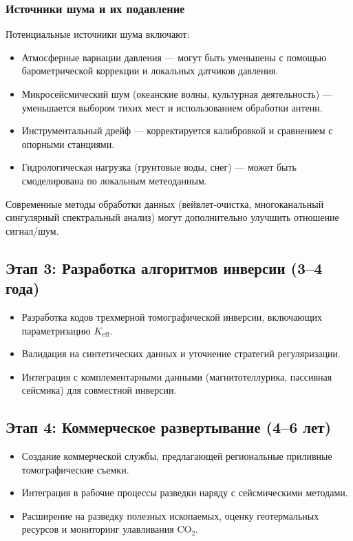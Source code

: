 \documentclass[12pt,a4paper]{article}
\theoremstyle{remark}
\newcommand{\Keff}{K_{\mathrm{eff}}}
\begin{document}
	\subsubsection{Источники шума и их подавление}
	
	Потенциальные источники шума включают:
	\begin{itemize}
		\item Атмосферные вариации давления — могут быть уменьшены с помощью барометрической коррекции и локальных датчиков давления.
		\item Микросейсмический шум (океанские волны, культурная деятельность) — уменьшается выбором тихих мест и использованием обработки антенн.
		\item Инструментальный дрейф — корректируется калибровкой и сравнением с опорными станциями.
		\item Гидрологическая нагрузка (грунтовые воды, снег) — может быть смоделирована по локальным метеоданным.
	\end{itemize}
	
	Современные методы обработки данных (вейвлет-очистка, многоканальный сингулярный спектральный анализ) могут дополнительно улучшить отношение сигнал/шум.
	
	\subsection{Этап 3: Разработка алгоритмов инверсии (3–4 года)}
	
	\begin{itemize}
		\item Разработка кодов трехмерной томографической инверсии, включающих параметризацию $\Keff$.
		\item Валидация на синтетических данных и уточнение стратегий регуляризации.
		\item Интеграция с комплементарными данными (магнитотеллурика, пассивная сейсмика) для совместной инверсии.
	\end{itemize}
	
	\subsection{Этап 4: Коммерческое развертывание (4–6 лет)}
	
	\begin{itemize}
		\item Создание коммерческой службы, предлагающей региональные приливные томографические съемки.
		\item Интеграция в рабочие процессы разведки наряду с сейсмическими методами.
		\item Расширение на разведку полезных ископаемых, оценку геотермальных ресурсов и мониторинг улавливания CO$_2$.
	\end{itemize}
	
\end{document}
